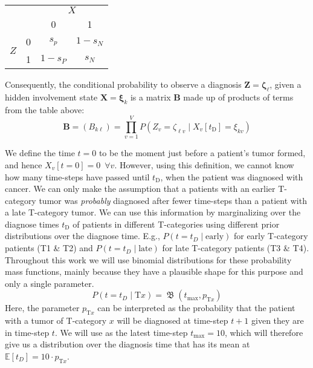 \documentclass[twocolumn]{aastex631}
\begin{document}
\noindent
\begin{center}
    \begin{tabular}{|cc|cc|}
        \hline
        & & \multicolumn{2}{c|}{$X$} \\
        & & 0 & 1 \\
        \hline
        \multirow{2}{*}{$Z$} & 0 & $s_p$ & $1 - s_N$ \\
        & 1 & $1 - s_P$ & $s_N$ \\
        \hline
    \end{tabular}
\end{center}

Consequently, the conditional probability to observe a diagnosis $\mathbf{Z}=\boldsymbol{\zeta}_\ell$, given a hidden involvement state $\mathbf{X}=\boldsymbol{\xi}_k$ is a matrix $\mathbf{B}$ made up of products of terms from the table above:
%
\begin{equation} \label{eq:transition_matrix}
    \mathbf{B} = \left( B_{k\ell} \right) = \prod_{v=1}^V P\left( Z_v = \zeta_{\ell v} \mid X_v[t_\text{D}] = \xi_{kv} \right)
\end{equation}

We define the time $t=0$ to be the moment just before a patient's tumor formed, and hence $X_v[t=0]=0 \,\,\, \forall v$. However, using this definition, we cannot know how many time-steps have passed until $t_\text{D}$, when the patient was diagnosed with cancer. We can only make the assumption that a patients with an earlier T-category tumor was \emph{probably} diagnosed after fewer time-steps than a patient with a late T-category tumor. We can use this information by marginalizing over the diagnose times $t_\text{D}$ of patients in different T-categories using different prior distributions over the diagnose time. E.g., $P \left( t=t_D \mid \text{early} \right)$ for early T-category patients (T1 \& T2) and $P \left( t=t_D \mid \text{late} \right)$ for late T-category patients (T3 \& T4). Throughout this work we will use binomial distributions for these probability mass functions, mainly because they have a plausible shape for this purpose and only a single parameter.
%
\begin{equation} \label{eq:time_dist}
    P \left( t = t_D \mid \text{T}x \right) = \operatorname{\mathfrak{B}}(t_\text{max},p_{\text{T}x})
\end{equation}
%
Here, the parameter $p_{\text{T}x}$ can be interpreted as the probability that the patient with a tumor of T-category $x$ will be diagnosed at time-step $t+1$ given they are in time-step $t$. We will use as the latest time-step $t_\text{max} = 10$, which will therefore give us a distribution over the diagnosis time that has its mean at $\mathbb{E}[t_D] = 10 \cdot p_{\text{T}x}$.
\end{document}
